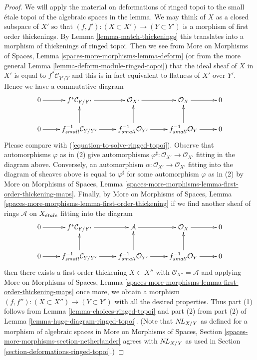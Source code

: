 \begin{proof}
We will apply the material on deformations of ringed topoi
to the small \'etale topoi of the algebraic spaces in the lemma.
We may think of $X$ as a closed subspace of $X'$
so that $(f, f') : (X \subset X') \to (Y \subset Y')$
is a morphism of first order thickenings.
By Lemma \ref{lemma-match-thickenings}
this translates into a morphism of thickenings of ringed topoi.
Then we see from More on Morphisms of Spaces, Lemma
\ref{spaces-more-morphisms-lemma-deform}
(or from the more general Lemma \ref{lemma-deform-module-ringed-topoi})
that the ideal sheaf of $X$ in $X'$ is equal to $f^*\mathcal{C}_{Y'/Y}$
and this is in fact equivalent to flatness of $X'$ over $Y'$.
Hence we have a commutative diagram
$$
\xymatrix{
0 \ar[r] & f^*\mathcal{C}_{Y/Y'} \ar[r] &
\mathcal{O}_{X'} \ar[r] &
\mathcal{O}_X \ar[r] & 0 \\
0 \ar[r] &
f_{small}^{-1}\mathcal{C}_{Y/Y'} \ar[u] \ar[r] &
f_{small}^{-1}\mathcal{O}_{Y'} \ar[u] \ar[r] &
f_{small}^{-1}\mathcal{O}_Y \ar[u] \ar[r] & 0
}
$$
Please compare with (\ref{equation-to-solve-ringed-topoi}).
Observe that automorphisms $\varphi$ as in (2)
give automorphisms $\varphi^\sharp : \mathcal{O}_{X'} \to \mathcal{O}_{X'}$
fitting in the diagram above. Conversely, an automorphism
$\alpha : \mathcal{O}_{X'} \to \mathcal{O}_{X'}$
fitting into the diagram of sheaves above is equal to $\varphi^\sharp$
for some automorphism $\varphi$ as in (2)
by More on Morphisms of Spaces, Lemma
\ref{spaces-more-morphisms-lemma-first-order-thickening-maps}.
Finally, by More on Morphisms of Spaces, Lemma
\ref{spaces-more-morphisms-lemma-first-order-thickening}
if we find another sheaf of rings $\mathcal{A}$ on $X_{\acute{e}tale}$
fitting into the diagram
$$
\xymatrix{
0 \ar[r] & f^*\mathcal{C}_{Y/Y'} \ar[r] &
\mathcal{A} \ar[r] &
\mathcal{O}_X \ar[r] & 0 \\
0 \ar[r] &
f_{small}^{-1}\mathcal{C}_{Y/Y'} \ar[u] \ar[r] &
f_{small}^{-1}\mathcal{O}_{Y'} \ar[u] \ar[r] &
f_{small}^{-1}\mathcal{O}_Y \ar[u] \ar[r] & 0
}
$$
then there exists a first order thickening $X \subset X''$
with $\mathcal{O}_{X''} = \mathcal{A}$ and applying 
More on Morphisms of Spaces, Lemma
\ref{spaces-more-morphisms-lemma-first-order-thickening-maps}
once more, we obtain a morphism
$(f, f'') : (X \subset X'') \to (Y \subset Y')$ with all the
desired properties.
Thus part (1) follows from
Lemma \ref{lemma-choices-ringed-topoi}
and part (2) from part (2) of
Lemma \ref{lemma-huge-diagram-ringed-topoi}.
(Note that $\mathop{N\!L}\nolimits_{X/Y}$ as defined for a morphism of algebraic spaces in
More on Morphisms of Spaces, Section
\ref{spaces-more-morphisms-section-netherlander}
agrees with $\mathop{N\!L}\nolimits_{X/Y}$ as used in
Section \ref{section-deformations-ringed-topoi}.)
\end{proof}

